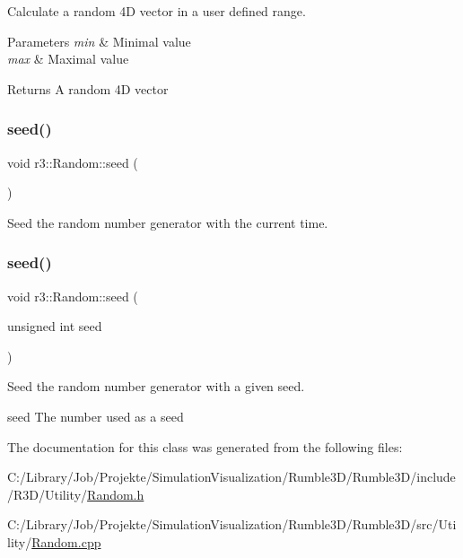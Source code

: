Calculate a random 4D vector in a user defined range. 


\begin{DoxyParams}{Parameters}
{\em min} & Minimal value \\
\hline
{\em max} & Maximal value \\
\hline
\end{DoxyParams}
\begin{DoxyReturn}{Returns}
A random 4D vector 
\end{DoxyReturn}
\mbox{\label{classr3_1_1_random_afa6a47432ea2058f6424618bf77494f2}} 
\subsubsection{\texorpdfstring{seed()}{seed()}\hspace{0.1cm}{\footnotesize\ttfamily [1/2]}}
{\footnotesize\ttfamily void r3\+::\+Random\+::seed (\begin{DoxyParamCaption}{ }\end{DoxyParamCaption})\hspace{0.3cm}{\ttfamily [static]}}



Seed the random number generator with the current time. 

\mbox{\label{classr3_1_1_random_a5fbe1e0d20952af9374f024a24735d80}} 
\subsubsection{\texorpdfstring{seed()}{seed()}\hspace{0.1cm}{\footnotesize\ttfamily [2/2]}}
{\footnotesize\ttfamily void r3\+::\+Random\+::seed (\begin{DoxyParamCaption}\item[{unsigned int}]{seed }\end{DoxyParamCaption})\hspace{0.3cm}{\ttfamily [static]}}



Seed the random number generator with a given seed. 

seed The number used as a seed 

The documentation for this class was generated from the following files\+:\begin{DoxyCompactItemize}
\item 
C\+:/\+Library/\+Job/\+Projekte/\+Simulation\+Visualization/\+Rumble3\+D/\+Rumble3\+D/include/\+R3\+D/\+Utility/\mbox{\hyperlink{_random_8h}{Random.\+h}}\item 
C\+:/\+Library/\+Job/\+Projekte/\+Simulation\+Visualization/\+Rumble3\+D/\+Rumble3\+D/src/\+Utility/\mbox{\hyperlink{_random_8cpp}{Random.\+cpp}}\end{DoxyCompactItemize}
